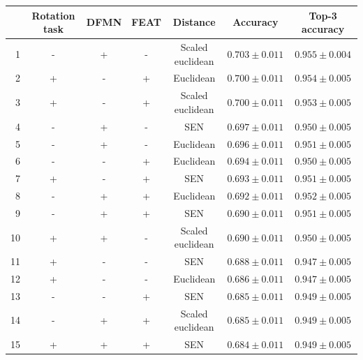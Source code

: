 \documentclass[a4paper, 12pt]{report}
\begin{document}
\begin{table}[h!]
\begin{adjustbox}{center}
\begin{tabular}{| r | c c c c | c |  c | }
\hline
    & Rotation task   & DFMN   & FEAT   & Distance         & Accuracy         & Top-3 accuracy   \\
    
    \hline
  1 & -               & +      & -      & Scaled euclidean & $0.703 \pm 0.011$ & $0.955 \pm 0.004$ \\
    \hline
  2 & +               & -      & +      & Euclidean        & $0.700 \pm 0.011$ & $0.954 \pm 0.005$ \\
    \hline
  3 & +               & -      & +      & Scaled euclidean & $0.700 \pm 0.011$ & $0.953 \pm 0.005$ \\
    \hline
  4 & -               & +      & -      & SEN              & $0.697 \pm 0.011$ & $0.950 \pm 0.005$ \\
    \hline
  5 & -               & +      & -      & Euclidean        & $0.696 \pm 0.011$ & $0.951 \pm 0.005$ \\
    \hline
  6 & -               & -      & +      & Euclidean        & $0.694 \pm 0.011$ & $0.950 \pm 0.005$ \\
    \hline
  7 & +               & -      & +      & SEN              & $0.693 \pm 0.011$ & $0.951 \pm 0.005$ \\
    \hline
  8 & -               & +      & +      & Euclidean        & $0.692 \pm 0.011$ & $0.952 \pm 0.005$ \\
    \hline
  9 & -               & +      & +      & SEN              & $0.690 \pm 0.011$ & $0.951 \pm 0.005$ \\
    \hline
 10 & +               & +      & -      & Scaled euclidean & $0.690 \pm 0.011$ & $0.950 \pm 0.005$ \\
    \hline
 11 & +               & -      & -      & SEN              & $0.688 \pm 0.011$ & $0.947 \pm 0.005$ \\
    \hline
 12 & +               & -      & -      & Euclidean        & $0.686 \pm 0.011$ & $0.947 \pm 0.005$ \\
    \hline
 13 & -               & -      & +      & SEN              & $0.685 \pm 0.011$ & $0.949 \pm 0.005$ \\
    \hline
 14 & -               & +      & +      & Scaled euclidean & $0.685 \pm 0.011$ & $0.949 \pm 0.005$ \\
    \hline
 15 & +               & +      & +      & SEN              & $0.684 \pm 0.011$ & $0.949 \pm 0.005$ \\

\end{tabular}
\end{adjustbox}
\end{table}
\end{document}
